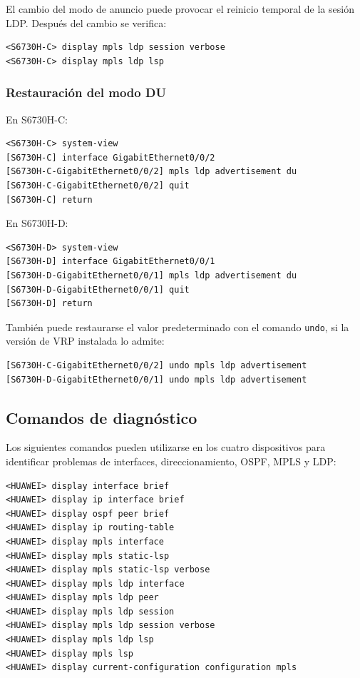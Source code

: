 El cambio del modo de anuncio puede provocar el reinicio temporal de la
sesión LDP. Después del cambio se verifica:

\begin{lstlisting}[style=terminal]
<S6730H-C> display mpls ldp session verbose
<S6730H-C> display mpls ldp lsp
\end{lstlisting}

\subsubsection{Restauración del modo DU}

En S6730H-C:

\begin{lstlisting}[style=terminal]
<S6730H-C> system-view
[S6730H-C] interface GigabitEthernet0/0/2
[S6730H-C-GigabitEthernet0/0/2] mpls ldp advertisement du
[S6730H-C-GigabitEthernet0/0/2] quit
[S6730H-C] return
\end{lstlisting}

En S6730H-D:

\begin{lstlisting}[style=terminal]
<S6730H-D> system-view
[S6730H-D] interface GigabitEthernet0/0/1
[S6730H-D-GigabitEthernet0/0/1] mpls ldp advertisement du
[S6730H-D-GigabitEthernet0/0/1] quit
[S6730H-D] return
\end{lstlisting}

También puede restaurarse el valor predeterminado con el comando
\texttt{undo}, si la versión de VRP instalada lo admite:

\begin{lstlisting}[style=terminal]
[S6730H-C-GigabitEthernet0/0/2] undo mpls ldp advertisement
[S6730H-D-GigabitEthernet0/0/1] undo mpls ldp advertisement
\end{lstlisting}

\subsection{Comandos de diagnóstico}

Los siguientes comandos pueden utilizarse en los cuatro dispositivos para
identificar problemas de interfaces, direccionamiento, OSPF, MPLS y LDP:

\begin{lstlisting}[style=terminal]
<HUAWEI> display interface brief
<HUAWEI> display ip interface brief
<HUAWEI> display ospf peer brief
<HUAWEI> display ip routing-table
<HUAWEI> display mpls interface
<HUAWEI> display mpls static-lsp
<HUAWEI> display mpls static-lsp verbose
<HUAWEI> display mpls ldp interface
<HUAWEI> display mpls ldp peer
<HUAWEI> display mpls ldp session
<HUAWEI> display mpls ldp session verbose
<HUAWEI> display mpls ldp lsp
<HUAWEI> display mpls lsp
<HUAWEI> display current-configuration configuration mpls
\end{lstlisting}

